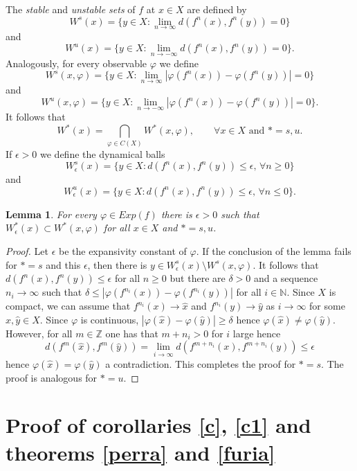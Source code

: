 \documentclass[11pt,letterpaper]{amsart}
\newtheorem{lem}{Lemma}
\begin{document}
The {\em stable} and {\em unstable sets} of $f$ at $x\in X$ are defined by
$$
W^s(x)=\{y\in X:\lim_{n\to \infty}d(f^n(x),f^n(y))=0\}
$$
and
$$
W^u(x)=\{y\in X:\lim_{n\to- \infty}d(f^n(x),f^n(y))=0\}.
$$
Analogously, for every observable $\varphi$ we define
$$
W^s(x,\varphi)=\{y\in X:\lim_{n\to \infty}|\varphi(f^n(x))-\varphi(f^n(y))|=0\}
$$
and
$$
W^u(x,\varphi)=\{y\in X:\lim_{n\to -\infty}|\varphi(f^n(x))-\varphi(f^n(y))|=0\}.
$$
It follows that
$$
W^*(x)=\bigcap_{\varphi\in C(X)}W^*(x,\varphi),\quad\quad\forall x\in X\mbox{ and }*=s,u.
$$
If $\epsilon>0$ we define the dynamical balls
$$
W^s_\epsilon(x)=\{y\in X:d(f^n(x),f^n(y))\leq\epsilon,\, \forall n\geq0\}
$$
and
$$
W^u_\epsilon(x)=\{y\in X:d(f^n(x),f^n(y))\leq\epsilon,\, \forall n\leq0\}.
$$

\begin{lem}
\label{inteligencia}
For every $\varphi\in Exp(f)$ there is $\epsilon>0$ such that
$W^*_\epsilon(x)\subset W^*(x,\varphi)$ for all $x\in X$ and $*=s,u$.
\end{lem}


\begin{proof}
Let $\epsilon$ be the expansivity constant of $\varphi$.
If the conclusion of the lemma fails for $*=s$ and this $\epsilon$, then
there is $y\in W^s_\epsilon(x)\setminus W^s(x,\varphi)$.
It follows that
$d(f^n(x),f^n(y))\leq\epsilon$ for all $n\geq0$ but there are $\delta>0$
and a sequence $n_i\to\infty$ such that
$\delta\leq |\varphi(f^{n_i}(x))-\varphi(f^{n_i}(y))|$ for all $i\in\mathbb{N}$.
Since $X$ is compact, we can assume that
$f^{n_i}(x)\to \hat{x}$ and $f^{n_i}(y)\to \hat{y}$ as $i\to\infty$ for some
$\hat{x},\hat{y}\in X$.
Since $\varphi$ is continuous,
$|\varphi(\hat{x})-\varphi(\hat{y})|\geq\delta$ hence
$\varphi(\hat{x})\neq \varphi(\hat{y})$.
However,
for all $m\in\mathbb{Z}$ one has that
$m+n_i>0$ for $i$ large hence
$$
d(f^m(\hat{x}),f^m(\hat{y}))=\lim_{i\to\infty}d(f^{m+n_i}(x),f^{m+n_i}(y))\leq\epsilon
$$
hence $\varphi(\hat{x})=\varphi(\hat{y})$ a contradiction.
This completes the proof for $*=s$. The proof is analogous for $*=u$.
\end{proof}










\section{Proof of corollaries \ref{c}, \ref{c1} and theorems \ref{perra} and \ref{furia}}
\label{sec3}
\end{document}
